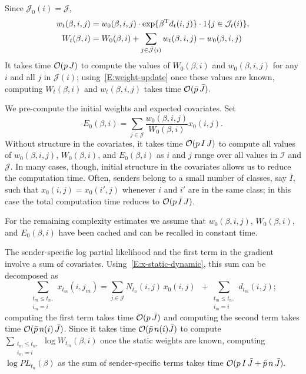 \documentclass[final]{statsoc}
\begin{document}
Since $\mathcal{J}_0(i) = \mathcal{J}$,
\begin{subequations}\label{E:weight-update}
\begin{align}
    w_{t}(\beta,i,j)
        &=
            w_{0}(\beta,i,j)
            \cdot
            \exp\{ \beta^{\mathrm{T}} d_t(i,j) \}
            \cdot
            1\{j \in \mathcal{J}_t(i)\},
    \label{E:weight-update-pair}
    \\
    W_{t}(\beta,i)
        &=
            W_{0}(\beta,i)
            +
            \sum_{j \in \mathcal{\bar J}(i)}
                w_{t}(\beta,i,j) - w_{0}(\beta,i,j)
    \label{E:weight-sum-update}
\end{align}
\end{subequations}
It takes time $\mathcal{O}(p \, J)$ to compute the values of
$W_{0}(\beta,i)$ and $w_{0}(\beta,i,j)$ for any $i$ and all
$j$ in $\mathcal{J}(i)$; using~\eqref{E:weight-update} once these values are
known, computing  $W_{t}(\beta,i)$ and $w_{t}(\beta,i,j)$ takes time
\(
    \mathcal{O}(\bar p \, \bar J).
\)

We pre-compute the initial weights and expected covariates.  Set
\[
    E_0(\beta, i)
        =
        \sum_{j \in \mathcal{J}}
            \frac{w_{0}(\beta, i,j)}{W_{0}(\beta, i)}
            x_0(i,j).
\]
Without structure in the covariates, it takes time
$\mathcal{O}(p \, I \, J)$ to compute all values of $w_0(\beta, i,j)$,
$W_0(\beta, i)$, and $E_0(\beta, i)$
as $i$ and $j$ range over all values in $\mathcal{I}$ and $\mathcal{J}$.
In many cases, though, initial structure in the covariates allows us
to reduce the computation time.  Often, senders belong to a small number of
classes, say $\bar I$, such that $x_{0}(i,j) = x_{0}(i',j)$ whenever $i$ and
$i'$ are in the same class; in this case the total computation time
reduces to $\mathcal{O}(p \, \bar I \, J)$.

For the remaining complexity estimates we assume that $w_0(\beta, i,j)$,
$W_0(\beta, i)$, and $E_0(\beta, i)$ have been cached and can be recalled
in constant time.

The sender-specific log partial likelihood and the first term in the gradient
involve a sum of covariates.  Using~\eqref{E:x-static-dynamic}, this sum can
be decomposed as
\[
    \sum_{\substack{t_m \leq t_n, \\ i_m = i}}
        x_{t_m}\!(i,j_m)
        =
            \sum_{j \in \mathcal{J}}
                N_{t_n}\!(i,j) \, x_0(i,j)
            \,\,\,
            +
            \sum_{\substack{t_m \leq t_n, \\ i_m = i}}
                d_{t_m}\!(i,j);
\]
computing the first term takes time $\mathcal{O}(p \, \bar J)$ and computing the second
term takes time $\mathcal{O}(\bar p \, n(i) \, \bar J)$.  Since it takes time
$\mathcal{O}(\bar p \, n(i) \bar J)$
to compute
\(
    \sum_{\substack{t_m \leq t_n, \\ i_m = i}}
        \log W_{t_m}\!(\beta, i)
\)
once the static weights are known, computing $\log \mathit{PL}_{t_n}(\beta)$
as the sum of sender-specific terms takes time
\(
    \mathcal{O}(p \, I \, \bar J + \bar p \, n \, \bar J).
\)
\end{document}
